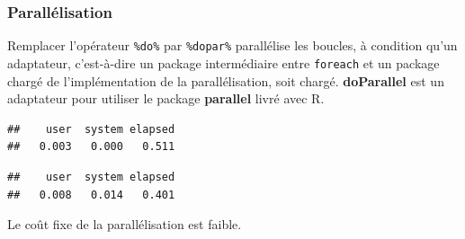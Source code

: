 \documentclass[
  12pt,
  french,
  a4paper,
  extrafontsizes,onecolumn,openright
  ]{memoir}
\newenvironment{Shaded}{\begin{snugshade}}{\end{snugshade}}
\newcommand{\CommentTok}[1]{\textcolor[rgb]{0.56,0.35,0.01}{\textit{#1}}}
\newcommand{\DataTypeTok}[1]{\textcolor[rgb]{0.13,0.29,0.53}{#1}}
\newcommand{\KeywordTok}[1]{\textcolor[rgb]{0.13,0.29,0.53}{\textbf{#1}}}
\newcommand{\NormalTok}[1]{#1}
\newcommand{\OperatorTok}[1]{\textcolor[rgb]{0.81,0.36,0.00}{\textbf{#1}}}
\newcommand{\StringTok}[1]{\textcolor[rgb]{0.31,0.60,0.02}{#1}}
\begin{document}
\hypertarget{paralluxe9lisation}{%
\subsubsection{Parallélisation}\label{paralluxe9lisation}}

Remplacer l'opérateur \texttt{\%do\%} par \texttt{\%dopar\%} parallélise les boucles, à condition qu'un adaptateur, c'est-à-dire un package intermédiaire entre \texttt{foreach} et un package chargé de l'implémentation de la parallélisation, soit chargé.
\textbf{doParallel} est un adaptateur pour utiliser le package \textbf{parallel} livré avec R.

\scriptsize

\begin{Shaded}
\end{Shaded}

\begin{verbatim}
##    user  system elapsed 
##   0.003   0.000   0.511
\end{verbatim}

\begin{Shaded}
\end{Shaded}

\begin{verbatim}
##    user  system elapsed 
##   0.008   0.014   0.401
\end{verbatim}

\normalsize

Le coût fixe de la parallélisation est faible.
\end{document}

